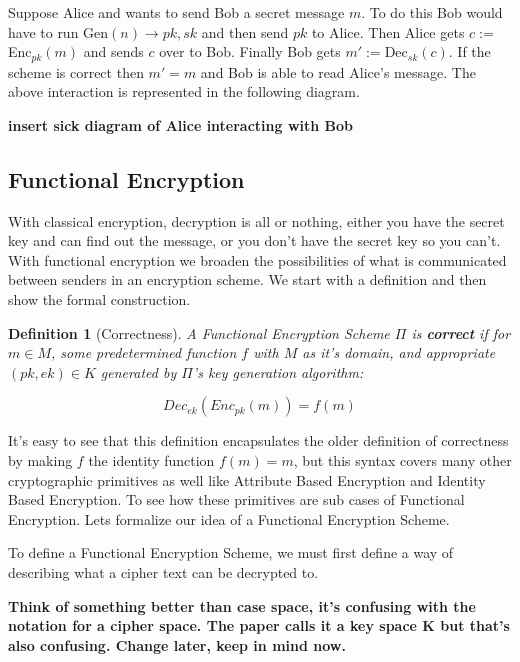 \documentclass[12pt,twoside]{reedthesis}
\newtheorem{definition}{Definition}
\begin{document}
\par Suppose Alice and wants to send Bob a secret message $m$. To do this Bob would have to run Gen$(n) \rightarrow pk, sk$ and then send $pk$ to Alice. Then Alice gets $c:= $Enc$_{pk}(m)$ and sends $c$ over to Bob. Finally Bob gets $m':= $Dec$_{sk}(c)$. If the scheme is correct then $m' = m$ and Bob is able to read Alice's message. The above interaction is represented in the following diagram.
\begin{center}
\textbf{insert sick diagram of Alice interacting with Bob}
\end{center}


\newcommand{\Enc}[0]{Enc}
\newcommand{\Dec}[0]{Dec}
\subsection{Functional Encryption}

With classical encryption, decryption is all or nothing, either you have the secret key and can find out the message, or you don't have the secret key so you can't. With functional encryption we broaden the possibilities of what is communicated between senders in an encryption scheme. We start with a definition and then show the formal construction.
\begin{definition}[Correctness]
A Functional Encryption Scheme $\Pi$ is \textbf{correct} if for $m \in M$, some predetermined function $f$ with $M$ as it's domain, and appropriate $(pk,ek)\in K$ generated by $\Pi$'s key generation algorithm:

$$\Dec_{ek}(\Enc_{pk}(m)) = f(m) $$
\end{definition}

It's easy to see that this definition encapsulates the older definition of correctness by making $f$ the identity function $f(m) = m$, but this syntax covers many other cryptographic primitives as well like Attribute Based Encryption and Identity Based Encryption. To see how these primitives are sub cases of Functional Encryption. Lets formalize our idea of a Functional Encryption Scheme. 
\par To define a Functional Encryption Scheme, we must first define a way of describing what a cipher text can be decrypted to.

\begin{center}
\textbf{Think of something better than case space, it's confusing with the notation for a cipher space. The paper calls it a key space K but that's also confusing. Change later, keep in mind now.}
\end{center}
\end{document}
